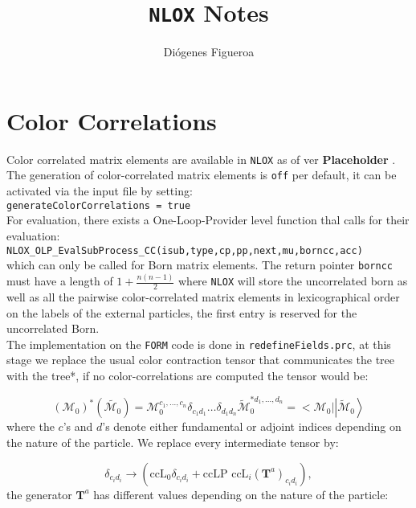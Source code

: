 \documentclass[a4paper]{article}
\title{\texttt{NLOX} Notes}
\author{Diógenes Figueroa}
\def \NLOX{\texttt{NLOX} }
\def \Placeholder{ \textbf{Placeholder }}
\begin{document}
\maketitle

\section{Color Correlations}
Color correlated matrix elements are available in \NLOX as of ver \Placeholder.
The generation of color-correlated matrix elements is \texttt{off} per default, 
it can be activated via the input file by setting:\\

  \texttt{generateColorCorrelations = true}\\

For evaluation, there exists a One-Loop-Provider level function thal calls for their evaluation:\\

  \texttt{NLOX\_OLP\_EvalSubProcess\_CC(isub,type,cp,pp,next,mu,borncc,acc)}\\
  
  
\noindent which can only be called for Born matrix elements. 
The return pointer \texttt{borncc} must have a length of $1+\frac{n(n-1)}{2}$ where \texttt{NLOX} will store 
the uncorrelated born as well as all the pairwise color-correlated matrix elements in lexicographical order on the labels of the external particles, the first entry is reserved for the uncorrelated Born.\\

The implementation on the \texttt{FORM} code is done in \texttt{redefineFields.prc}, at this stage 
we replace the usual color contraction tensor that communicates the tree with the tree*, if no 
color-correlations are computed the tensor would be:

\begin{equation}
 (\mathcal{M}_0)^*(\tilde{\mathcal{M}_0}) = 
 \mathcal{M}_0^{c_1,...,c_n}\delta_{c_1d_1}\dots\delta_{d_1d_n}\tilde{\mathcal{M}}_0^{*d_1,...,d_n} 
 = \Big<\mathcal{M}_0\Big|\left|\mathcal{\tilde M}_0\right>
\end{equation}
where the $c$'s and $d$'s denote either fundamental or adjoint indices depending on the nature 
of the particle. We replace every intermediate tensor by:

\begin{equation}
 \delta_{c_id_i}\rightarrow \left(\text{ccL}_0\delta_{c_id_i}+ \text{ccLP }\text{ccL}_i (\textbf{T}^a)_{c_id_i}\right),
\end{equation}
the generator $\textbf{T}^a$ has different values depending on the nature of the particle:
\end{document}
